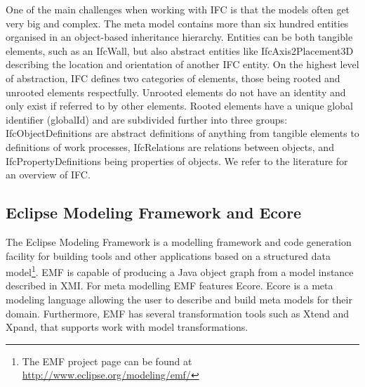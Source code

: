 One of the main challenges when working with IFC is that the models often get very big and complex. The meta model contains more than six hundred entities organised in an object-based inheritance hierarchy. Entities can be both tangible elements, such as an IfcWall, but also abstract entities like IfcAxis2Placement3D describing the location and orientation of another IFC entity. On the highest level of abstraction, IFC defines two categories of elements, those being rooted and unrooted elements respectfully. Unrooted elements do not have an identity and only exist if referred to by other elements. Rooted elements have a unique global identifier (globalId) and are subdivided further into three groups: IfcObjectDefinitions are abstract definitions of anything from tangible elements to definitions of work processes, IfcRelations are relations between objects, and IfcPropertyDefinitions being properties of objects. We refer to the literature for an overview of IFC.

\subsection{Eclipse Modeling Framework and Ecore}
The Eclipse Modeling Framework is a modelling framework and code generation facility for building tools and other applications based on a structured data model\footnote{The EMF project page can be found at \url{http://www.eclipse.org/modeling/emf/}}. EMF is capable of producing a Java object graph from a model instance described in XMI. For meta modelling EMF features Ecore. Ecore is a meta modeling language allowing the user to describe and build meta models for their domain. Furthermore, EMF has several transformation tools such as Xtend and Xpand, that supports work with model transformations.
